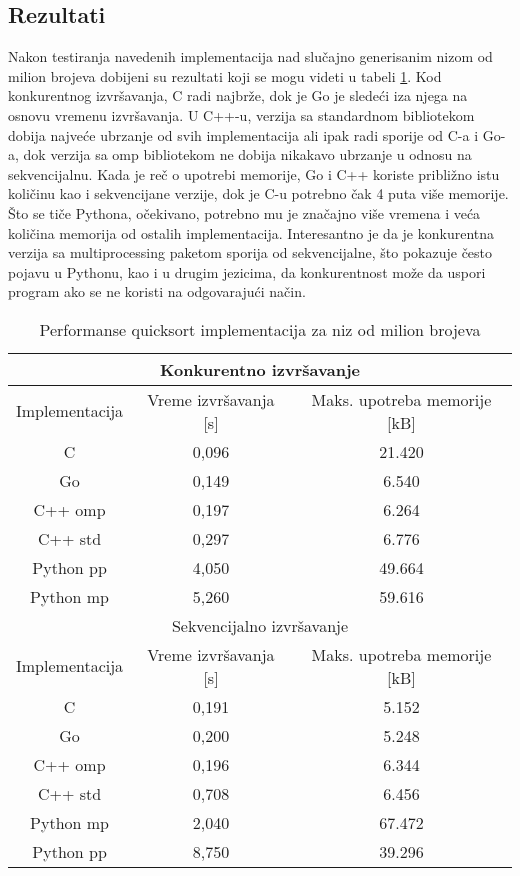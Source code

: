 \documentclass[12pt,oneside]{memoir}
\begin{document}
\subsection{Rezultati}\label{qs:rez}
Nakon testiranja navedenih implementacija nad slučajno generisanim nizom od milion brojeva dobijeni su rezultati koji se mogu videti u tabeli \ref{tab:qs1}.  Kod konkurentnog izvršavanja, C radi najbrže, dok je Go je sledeći iza njega na osnovu vremenu izvršavanja. U C++-u, verzija sa standardnom bibliotekom dobija najveće ubrzanje od svih implementacija ali ipak radi sporije od C-a i Go-a, dok verzija sa omp bibliotekom ne dobija nikakavo ubrzanje u odnosu na sekvencijalnu. Kada je reč o upotrebi memorije,  Go i C++ koriste približno istu količinu kao i sekvencijane verzije, dok je C-u potrebno čak 4 puta više memorije. Što se tiče Pythona, očekivano, potrebno mu je značajno više vremena i veća količina memorija od ostalih implementacija. Interesantno je da je konkurentna verzija sa multiprocessing paketom sporija od sekvencijalne, što pokazuje često pojavu u Pythonu, kao i u drugim jezicima, da konkurentnost može da uspori program ako se ne koristi na odgovarajući način. 

\begin{table}
\begin{center}
\caption{Performanse quicksort implementacija za niz od milion brojeva}
\begin{tabular}{|c|c|c|}
\hline
\multicolumn{3}{|c|}{Konkurentno izvršavanje} \\ \hline
Implementacija &  Vreme izvršavanja [s]& Maks. upotreba memorije [kB]\\ \hline
C 		&  0,096	&  21.420\\ 
Go  		&  0,149	&  6.540\\ 
C++  omp 	&  0,197 	&  6.264\\
C++  std 	&  0,297 	&  6.776\\ 
Python pp  	&  4,050	& 49.664\\ 
Python mp 	&  5,260 	&  59.616\\ \hline
\multicolumn{3}{|c|}{Sekvencijalno izvršavanje} \\ \hline
Implementacija &  Vreme izvršavanja [s] & Maks. upotreba memorije [kB]\\ \hline
C 		& 0,191 	&  5.152\\
Go	 	& 0,200 	&  5.248  \\
C++  omp 	& 0,196  	&  6.344  \\
C++  std 	& 0,708 	&  6.456\\
Python mp  	& 2,040	&  67.472\\ 
Python pp  	& 8,750 	&  39.296\\ \hline
\end{tabular}
\label{tab:qs1}
\end{center}
\end{table}
\end{document}
